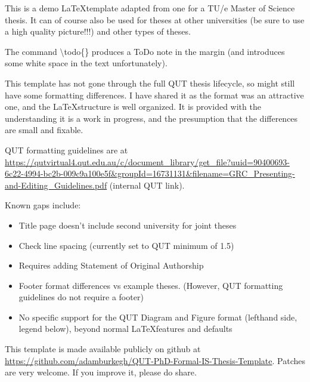 This is a demo \LaTeX template adapted from one for a TU/e Master of Science thesis. It can of course also be used for theses at other universities (be sure to use a high quality picture!!!) and other types of theses.

The command \textbackslash todo\{\} produces a  ToDo note in the margin (and introduces some white space in the text unfortunately).

This template has not gone through the full QUT thesis lifecycle, so might still have some formatting differences. I have shared it as the format was an attractive one, and the \LaTeX structure is well organized. It is provided with the understanding it is a work in progress, and the presumption that the differences are small and fixable. 

QUT formatting guidelines are at \url{https://qutvirtual4.qut.edu.au/c/document_library/get_file?uuid=90400693-6c22-4994-bc2b-009c9a100e5f&groupId=16731131&filename=GRC_Presenting-and-Editing_Guidelines.pdf} (internal QUT link).

Known gaps include:
\begin{itemize}
    \item Title page doesn't include second university for joint theses
    \item Check line spacing (currently set to QUT minimum of 1.5)
    \item Requires adding Statement of Original Authorship
    \item Footer format differences vs example theses. (However, QUT formatting guidelines do not require a footer)
    \item No specific support for the QUT Diagram and Figure format (lefthand side, legend below), beyond normal \LaTeX features and defaults
\end{itemize}

This template is made available publicly on github at \url{https://github.com/adamburkegh/QUT-PhD-Formal-IS-Thesis-Template}. Patches are very welcome. If you improve it, please do share.

